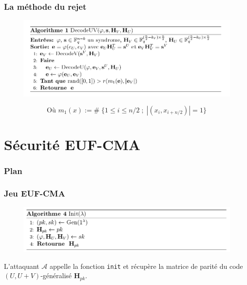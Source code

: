 \documentclass[10pt,a4paper]{beamer}
\theoremstyle{plain}
\theoremstyle{definition}
\begin{document}
\begin{frame}[fragile]
\frametitle{La méthode du rejet}
\vspace{-0.3in}
\begin{figure}[h]
\begin{center}
\includegraphics [scale=0.38]{algo_UV.png}
\end{center}
\end{figure}
$$ \text{Où  } m_1(x) := \# \; \{1  \leq i \leq n/2 \;;\; |(x_i, x_{i+n/2})| = 1\}$$
\end{frame}


\section{Sécurité EUF-CMA}

\begin{frame}
  \frametitle{Plan}
  \tableofcontents[currentsection,subsectionstyle=hide]
\end{frame}

\begin{frame}[fragile]
\frametitle{Jeu EUF-CMA}	
\begin{figure}[h]
		\includegraphics[width=\textwidth]{init.png}
\end{figure}

\vspace{0.1in}

L'attaquant $\mathcal{A}$ appelle la fonction \verb|init| et récupère la matrice de parité du code $(U,U+V)$-généralisé $\mathbf{H}_{pk}$.
\end{frame}
\end{document}

